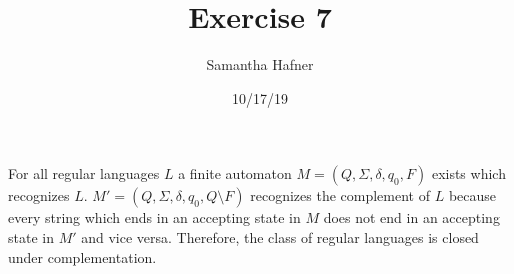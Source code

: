 \documentclass[12pt]{article}
\title{Exercise 7}
\author{Samantha Hafner}
\date{10/17/19}
\begin{document}
\maketitle

For all regular languages $L$ a finite automaton $M = (Q,\Sigma,\delta,q_0,F)$ exists which recognizes $L$. $M' = (Q,\Sigma,\delta,q_0,Q\setminus F)$ recognizes the complement of $L$ because every string which ends in an accepting state in $M$ does not end in an accepting state in $M'$ and vice versa. Therefore, the class of regular languages is closed under complementation.
\end{document}
